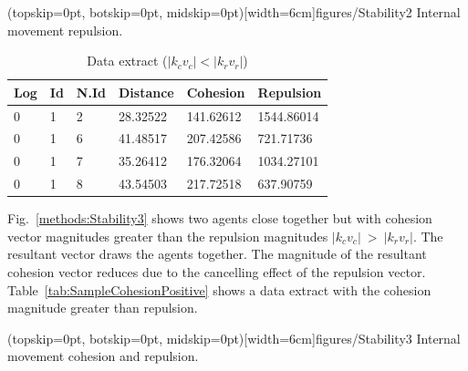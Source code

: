 \documentclass{ieeeaccess}
\begin{document}
\Figure[t!](topskip=0pt, botskip=0pt, midskip=0pt)[width=6cm]{figures/Stability2}
{Internal movement repulsion.\label{methods:Stability2}}


\begin{table}[H]
\begin{center}
\begin{tabular}{| l | l | l | l | l | l |}
\hline
Log &	Id &	N.Id &	Distance &	{\color{green}Cohesion} &	{\color{red}Repulsion} 	\\ \hline
0 & 1 & 2 & 28.32522 & {\color{green}141.62612} & {\color{red}1544.86014} \\ \hline
0 & 1 & 6 & 41.48517 & {\color{green}207.42586} & {\color{red}721.71736} \\ \hline
0 & 1 & 7 & 35.26412 & {\color{green}176.32064} & {\color{red}1034.27101} \\ \hline
0 & 1 & 8 & 43.54503 & {\color{green}217.72518} & {\color{red}637.90759} \\
\hline
\end{tabular}\caption{Data extract ($|k_cv_c| < |k_rv_r|$)} \label{tab:SampleReplusionPositive}
\end{center}
\end{table}

Fig.~\ref{methods:Stability3} shows two agents close together but with cohesion vector magnitudes greater than the repulsion magnitudes $|k_cv_c|~>~|k_rv_r|$. The resultant vector draws the agents together. The magnitude of the resultant cohesion vector reduces due to the cancelling effect of the repulsion vector. Table~\ref{tab:SampleCohesionPositive} shows a data extract with the cohesion magnitude greater than repulsion.

\Figure[t!](topskip=0pt, botskip=0pt, midskip=0pt)[width=6cm]{figures/Stability3}
{Internal movement cohesion and repulsion.\label{methods:Stability3}}

\end{document}
